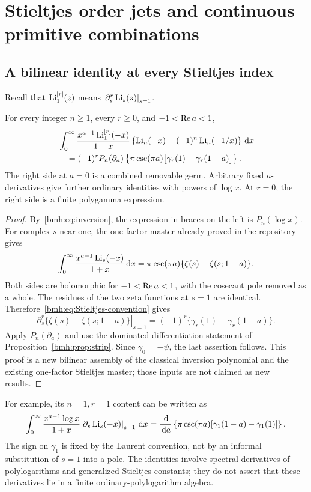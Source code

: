 \section{Stieltjes order jets and continuous primitive combinations}
\label{bmh:sec:stieltjes}

\subsection{A bilinear identity at every Stieltjes index}
Recall that $\operatorname{Li}_1^{[r]}(z)$ means
$\left.\partial_s^r\operatorname{Li}_s(z)\right|_{s=1}$.

\begin{theorem}
\label{bmh:thm:Stieltjes}
For every integer $n\ge1$, every $r\ge0$, and $-1<\operatorname{Re} a<1$,
\begin{align}
 &\int_0^\infty\frac{x^{a-1}\operatorname{Li}_1^{[r]}(-x)}{1+x}
      \left\{\operatorname{Li}_n(-x)+(-1)^n\operatorname{Li}_n(-1/x)\right\}\,\mathrm d x\notag\\
 &\quad=(-1)^r P_n(\partial_a)
 \left\{\pi\csc(\pi a)\bigl[\gamma_r(1)-\gamma_r(1-a)\bigr]\right\}.
 \label{bmh:eq:Stieltjes}
\end{align}
The right side at $a=0$ is a combined removable germ. Arbitrary fixed
$a$-derivatives give further ordinary identities with powers of
$\log x$. At $r=0$, the right side is a finite polygamma expression.
\end{theorem}
\begin{proof}
By~\eqref{bmh:eq:inversion}, the expression in braces on the left is
$P_n(\log x)$. For complex $s$ near one, the one-factor master already
proved in the repository~\cite{MLD} gives
\[
 \int_0^\infty\frac{x^{a-1}\operatorname{Li}_s(-x)}{1+x}\,\mathrm d x
 =\pi\csc(\pi a)\{\zeta(s)-\zeta(s;1-a)\}.
\]
Both sides are holomorphic for $-1<\operatorname{Re} a<1$, with the cosecant pole
removed as a whole. The residues of the two zeta functions at $s=1$
are identical. Therefore~\eqref{bmh:eq:Stieltjes-convention} gives
\[
 \left.\partial_s^r\{\zeta(s)-\zeta(s;1-a)\}\right|_{s=1}
 =(-1)^r\{\gamma_r(1)-\gamma_r(1-a)\}.
\]
Apply $P_n(\partial_a)$ and use the dominated differentiation statement
of Proposition~\ref{bmh:prop:strip}. Since $\gamma_0=-\psi$, the last
assertion follows. This proof is a new bilinear assembly of the classical
inversion polynomial and the existing one-factor Stieltjes master; those
inputs are not claimed as new results.
\end{proof}

For example, its $n=1,r=1$ content can be written as
\begin{equation}\label{bmh:eq:Stieltjes-example}
 \int_0^\infty\frac{x^{a-1}\log x}{1+x}
             \left.\partial_s\operatorname{Li}_s(-x)\right|_{s=1}\,\mathrm d x
 =\frac{\,\mathrm d}{\,\mathrm d a}\left\{
    \pi\csc(\pi a)[\gamma_1(1-a)-\gamma_1(1)]\right\}.
\end{equation}
The sign on $\gamma_1$ is fixed by the Laurent convention, not by an
informal substitution of $s=1$ into a pole. The identities involve
spectral derivatives of polylogarithms and generalized Stieltjes
constants; they do not assert that these derivatives lie in a finite
ordinary-polylogarithm algebra.

